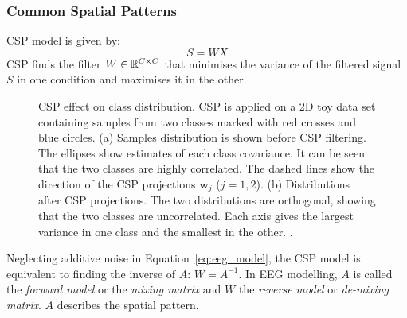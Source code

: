 \subsubsection{Common Spatial Patterns}

CSP model is given by:
\begin{equation}
\label{eq:csp}
S = WX
\end{equation}
CSP finds the filter $W \in \mathbb{R}^{C \times C}$ that minimises the variance of the filtered signal $S$ in one condition and maximises it in the other.
\begin{figure}[h!]
\centering
{}
\caption{CSP effect on class distribution. 
CSP is applied on a 2D toy data set containing samples from two classes marked with red crosses and blue circles. 
(a) Samples distribution is shown before CSP filtering. The ellipses show estimates of each class covariance. 
It can be seen that the two classes are highly correlated. 
The dashed lines show the direction of the CSP projections $\mathbf{w}_j$ ($j=1,2$). 
(b) Distributions after CSP projections. The two distributions are orthogonal, showing that the two classes are uncorrelated. 
Each axis gives the largest variance in one class and the smallest in the other. \citep[Image from][]{blankertz_optimizing_2008}.} 
\label{fig:class_scatter_csp}
\end{figure}
Neglecting additive noise in Equation~\eqref{eq:eeg_model}, the CSP model is equivalent to finding the inverse of $A$:
$W = A^{-1}$. 
In EEG modelling, $A$ is called the \emph{forward model} or the \emph{mixing matrix} and $W$ the \emph{reverse model} or \emph{de-mixing matrix}.  
$A$ describes the spatial pattern. 

